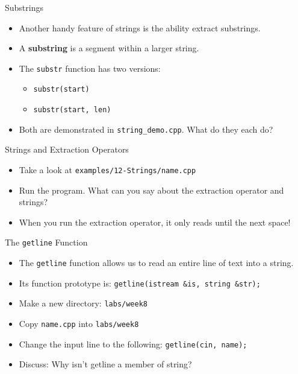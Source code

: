 \documentclass[]{beamer}
\begin{document}
\begin{frame}{Substrings}
    \begin{itemize}[<+->]
        \item Another handy feature of strings is the ability extract
            substrings.
        \item A \textbf{substring} is a segment within a larger
            string.
        \item The \texttt{substr} function has two versions:
            \begin{itemize}
                \item \texttt{substr(start)}
                \item \texttt{substr(start, len)}
            \end{itemize}
        \item Both are demonstrated in \texttt{string\_demo.cpp}.
            What do they each do?
    \end{itemize}
\end{frame}

\begin{frame}{Strings and Extraction Operators}
    \begin{itemize}[<+->]
        \item Take a look at \texttt{examples/12-Strings/name.cpp}
        \item Run the program.  What can you say about the extraction
            operator and strings?
        \item When you run the extraction operator, it only reads
            until the next space!
    \end{itemize}
\end{frame}

\begin{frame}{The \texttt{getline} Function}
    \begin{itemize}[<+->]
        \item The \texttt{getline} function allows us to read an
            entire line of text into a string.
        \item Its function prototype is:
            \newline\texttt{getline(istream \&is, string \&str);}
        \item Make a new directory: \texttt{labs/week8}
        \item Copy \texttt{name.cpp} into \texttt{labs/week8}
        \item Change the input line to the following:
            \newline\texttt{getline(cin, name);}
        \item Discuss:  Why isn't getline a member of string?
    \end{itemize}
\end{frame}
\end{document}
